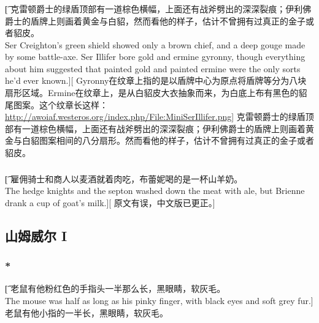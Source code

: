 \documentclass[12pt,a4paper]{article}
\begin{document}
\subsubsection{}\t[
	克雷顿爵士的绿盾顶部有一道棕色横幅，上面还有战斧劈出的深深裂痕；伊利佛爵士的盾牌上则画着黄金与白貂，然而看他的样子，估计不曾拥有过真正的金子或者貂皮。\\
	Ser Creighton's green shield showed only a brown chief, and a deep gouge made by some battle-axe. Ser Illifer bore gold and ermine gyronny, though everything about him suggested that painted gold and painted ermine were the only sorts he'd ever known.][
	Gyronny在纹章上指的是以盾牌中心为原点将盾牌等分为八块扇形区域。Ermine在纹章上，是从白貂皮大衣抽象而来，为白底上布有黑色的貂尾图案。这个纹章长这样：\url{http://awoiaf.westeros.org/index.php/File:MiniSerIllifer.png}]
	克雷顿爵士的绿盾顶部有一道棕色横幅，上面还有战斧劈出的深深裂痕；伊利佛爵士的盾牌上则画着黄金与白貂图案相间的八分扇形。然而看他的样子，估计不曾拥有过真正的金子或者貂皮。
	
\subsubsection{}\t[
	雇佣骑士和商人以麦酒就着肉吃，布蕾妮喝的是一杯山羊奶。\\
	The hedge knights and the septon washed down the meat with ale, but Brienne drank a cup of goat's milk.][
	原文有误，中文版已更正。]
		
\subsection{山姆威尔 I}
\subsubsection{\color{red}*}\t[
	老鼠有他粉红色的手指头一半那么长，黑眼睛，软灰毛。\\
	The mouse was half as long as his pinky finger, with black eyes and soft grey fur.]
	老鼠有他小指的一半长，黑眼睛，软灰毛。
\end{document}
